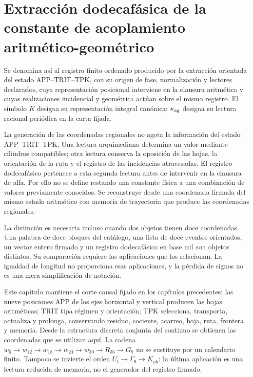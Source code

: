 \section{Extracción dodecafásica de la constante de acoplamiento aritmético-geométrico}
\label{x_reciprocidad:sec:k-registro}

\begin{definition}
\label{x_reciprocidad:lib01:definicion}
Se denomina así al registro finito ordenado producido por la extracción
orientada del estado APP--TRIT--TPK, con su origen de fase, normalización y
lectores declarados, cuya representación posicional interviene en la
clausura aritmética y cuyas realizaciones incidencial y geométrica actúan
sobre el mismo registro. El símbolo \(K\) designa su representación
integral canónica; \(\kappa_{\rm ag}\) designa su lectura racional
periódica en la carta fijada.
\end{definition}

La generación de las coordenadas regionales no agota la información del
estado APP--TRIT--TPK. Una lectura arquimediana determina un valor mediante
cilindros compatibles; otra lectura conserva la oposición de las hojas, la
orientación de la ruta y el registro de las incidencias atravesadas. El
registro dodecafásico pertenece a esta segunda lectura antes de intervenir en
la clausura de alfa. Por ello no se define restando una constante física a
una combinación de valores previamente conocidos. Se reconstruye desde una
coordenada firmada del mismo estado aritmético con memoria de trayectoria que produce las coordenadas
regionales.

La distinción es necesaria incluso cuando dos objetos tienen doce
coordenadas. Una palabra de doce bloques del catálogo, una lista de doce
eventos orientados, un vector entero firmado y un registro dodecafásico en base mil son
objetos distintos. Su comparación requiere las aplicaciones que los
relacionan. La igualdad de longitud no proporciona esas aplicaciones, y la
pérdida de signos no es una mera simplificación de notación.

Este capítulo mantiene el corte causal fijado en los capítulos precedentes:
las nueve posiciones APP de los ejes horizontal y vertical producen las
hojas aritméticas; TRIT tipa régimen y orientación; TPK selecciona,
transporta, actualiza y prolonga, conservando residuo, cociente, acarreo,
hoja, ruta, frontera y memoria. Desde la estructura discreta conjunta del
continuo se obtienen las coordenadas que se utilizan aquí. La cadena
\(w_6\to w_{12}\to w_{18}\to w_{24}\to w_{30}\to R_{36}\to G_9\)
no se sustituye por un calendario finito. Tampoco se invierte el orden
\(U_t\to\Gamma_9\to K_{\mathrm{ph}}\): la última aplicación es una
lectura reducida de memoria, no el generador del registro firmado.


